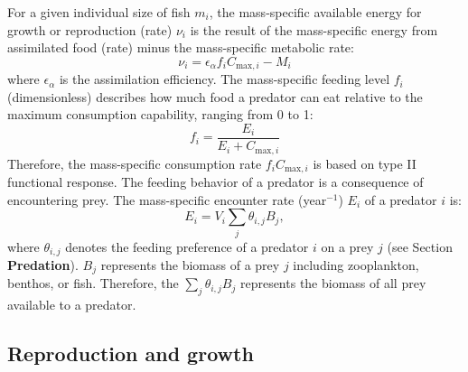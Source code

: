 \documentclass[
]{article}
\begin{document}
For a given individual size of fish \(m_i\), the mass-specific available
energy for growth or reproduction (rate) \(\nu_{i}\) is the result of
the mass-specific energy from assimilated food (rate) minus the
mass-specific metabolic rate: \begin{equation}
\nu_{i} = \epsilon_\alpha f_i C_{\mathrm{max},i} - M_i
\end{equation} where \(\epsilon_\alpha\) is the assimilation efficiency.
The mass-specific feeding level \(f_i\) (dimensionless) describes how
much food a predator can eat relative to the maximum consumption
capability, ranging from 0 to 1: \begin{equation}
f_{i} = \frac{E_{i}}{E_{i}+C_{\mathrm{max},i}}  \label{eq:feedinglvl}
\end{equation} Therefore, the mass-specific consumption rate
\(f_i C_{\mathrm{max},i}\) is based on type II functional response. The
feeding behavior of a predator is a consequence of encountering prey.
The mass-specific encounter rate (year\(^{-1}\)) \(E_{i}\) of a predator
\(i\) is: \begin{equation}
E_{i} = V_{i}  \sum_{j} \theta_{i,j} B_j, \label{eq:encounter}
\end{equation} where \(\theta_{i,j}\) denotes the feeding preference of
a predator \(i\) on a prey \(j\) (see Section \textbf{Predation}).
\(B_j\) represents the biomass of a prey \(j\) including zooplankton,
benthos, or fish. Therefore, the \(\sum_{j} \theta_{i,j} B_j\)
represents the biomass of all prey available to a predator.

\subsection{Reproduction and growth}\label{reproduction-and-growth}
\end{document}
